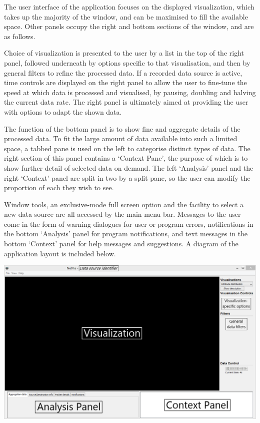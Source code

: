 
The user interface of the application focuses on the displayed
visualization, which takes up the majority of the window, and can be maximised
to fill the available space. Other panels occupy the right and bottom sections
of the window, and are as follows.

Choice of visualization is presented to the user by a list in the top of the
right panel, followed underneath by options specific to that visualisation, and
then by general filters to refine the processed data. If a recorded data source
is active, time controls are displayed on the right panel to allow the user to
fine-tune the speed at which data is processed and visualised, by pausing,
doubling and halving the current data rate. The right panel is ultimately aimed
at providing the user with options to adapt the shown data.

The function of the bottom panel is to show fine and aggregate details of the
processed data. To fit the large amount of data available into such a limited
space, a tabbed pane is used on the left to categorise distinct types of data.
The right section of this panel contains a `Context Pane', the purpose of
which is to show further detail of selected data on demand. The left
`Analysis' panel and the right `Context' panel are split in two by a split
pane, so the user can modify the proportion of each they wish to see.


Window tools, an exclusive-mode full screen option and the facility to select
a new data source are all accessed by the main menu bar. Messages to the user
come in the form of warning dialogues for user or program errors, notifications
in the bottom `Analysis' panel for program notifications, and text messages in
the bottom `Context' panel for help messages and suggestions. A diagram of the
application layout is included below.

\includegraphics[width=\linewidth]{materials/layout-diagram.png}
